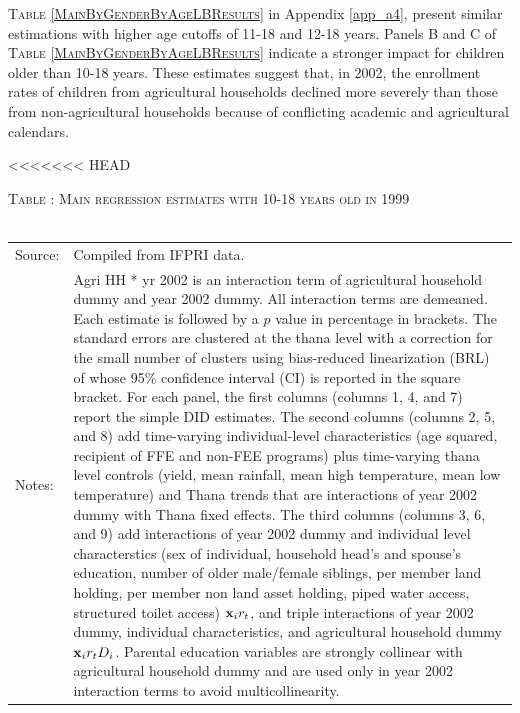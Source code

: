 \documentclass[12pt,letterpaper]{article}
\newcommand{\bfx}{\ensuremath{\mbox{\bf x}}}
\newcommand{\0}{\ensuremath{\mbox{\boldmath $0$}}}
\begin{document}
\textsc{\small Table \ref{MainByGenderByAgeLBResults}} in Appendix \ref{app_a4}, present similar estimations with higher age cutoffs of 11-18 and 12-18 years. Panels B and C of \textsc{Table \ref{MainByGenderByAgeLBResults}} indicate a stronger impact for children older than 10-18 years. These estimates suggest that, in 2002, the enrollment rates of children from agricultural households declined more severely than those from non-agricultural households because of conflicting academic and agricultural calendars.


<<<<<<< HEAD
\begin{table}\hfil\textsc{\footnotesize Table \thetable: Main regression estimates with 10-18 years old in 1999\label{base10}}\\\setlength{\tabcolsep}{.5pt}\renewcommand{\arraystretch}{.675}\hspace{-2em}\hfil\\\renewcommand{\arraystretch}{1}\hfil\begin{tabular}{>{\hfill\scriptsize}p{1cm}<{}>{\scriptsize}p{12cm}<{\hfill}} Source:& Compiled from IFPRI data. \\[-1ex] Notes:&   \textsf{Agri HH * yr 2002} is an interaction term of agricultural household dummy and year 2002 dummy. All interaction terms are demeaned. Each estimate is followed by a $p$ value in percentage in brackets. The standard errors are clustered at the thana level with a correction for the small number of clusters using bias-reduced linearization (BRL) of \citet{PustejovskyTipton2018} whose 95\% confidence interval (CI) is reported in the square bracket. 
For each panel, the first columns (columns 1, 4, and 7) report the simple DID estimates. The second columns (columns 2, 5, and 8) add time-varying individual-level characteristics (age squared, recipient of FFE and non-FEE programs) plus time-varying thana level controls (yield, mean rainfall, mean high temperature, mean low temperature) and \textsf{Thana trends} that are interactions of year 2002 dummy with Thana fixed effects. The third columns (columns 3, 6, and 9) add interactions of year 2002 dummy and individual level characterstics (sex of individual, household head's and spouse's education, number of older male/female siblings, per member land holding, per member non land asset holding, piped water access, structured toilet access) $\bfx_{i}r_{t}$, and triple interactions of year 2002 dummy, individual characteristics, and agricultural household dummy $\bfx_{i}r_{t}D_{i}$. Parental education variables are strongly collinear with agricultural household dummy and are used only in year 2002 interaction terms to avoid multicollinearity.  \end{tabular} \end{table}
\end{document}
